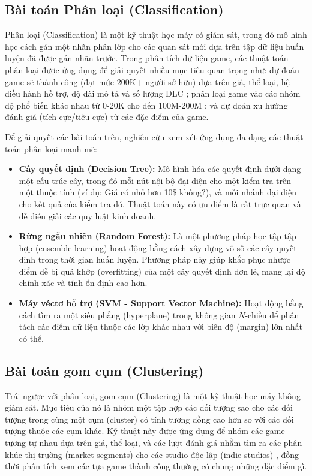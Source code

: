 \subsection{Bài toán Phân loại (Classification)}
\hspace{1cm} Phân loại (Classification) là một kỹ thuật học máy có giám sát, trong đó mô hình học cách gán một nhãn phân lớp cho các quan sát mới dựa trên tập dữ liệu huấn luyện đã được gán nhãn trước. Trong phân tích dữ liệu game, các thuật toán phân loại được ứng dụng để giải quyết nhiều mục tiêu quan trọng như: dự đoán game sẽ thành công (đạt mức 200K+ người sở hữu) dựa trên giá, thể loại, hệ điều hành hỗ trợ, độ dài mô tả và số lượng DLC ; phân loại game vào các nhóm độ phổ biến khác nhau từ 0-20K cho đến 100M-200M ; và dự đoán xu hướng đánh giá (tích cực/tiêu cực) từ các đặc điểm của game.

\hspace{1cm} Để giải quyết các bài toán trên, nghiên cứu xem xét ứng dụng đa dạng các thuật toán phân loại mạnh mẽ:
\begin{itemize}
    \item \textbf{Cây quyết định (Decision Tree):} Mô hình hóa các quyết định dưới dạng một cấu trúc cây, trong đó mỗi nút nội bộ đại diện cho một kiểm tra trên một thuộc tính (ví dụ: Giá có nhỏ hơn 10\$ không?), và mỗi nhánh đại diện cho kết quả của kiểm tra đó. Thuật toán này có ưu điểm là rất trực quan và dễ diễn giải các quy luật kinh doanh.
    \item \textbf{Rừng ngẫu nhiên (Random Forest):} Là một phương pháp học tập tập hợp (ensemble learning) hoạt động bằng cách xây dựng vô số các cây quyết định trong thời gian huấn luyện. Phương pháp này giúp khắc phục nhược điểm dễ bị quá khớp (overfitting) của một cây quyết định đơn lẻ, mang lại độ chính xác và tính ổn định cao hơn.
    \item \textbf{Máy véctơ hỗ trợ (SVM - Support Vector Machine):} Hoạt động bằng cách tìm ra một siêu phẳng (hyperplane) trong không gian $N$-chiều để phân tách các điểm dữ liệu thuộc các lớp khác nhau với biên độ (margin) lớn nhất có thể.
\end{itemize}

\subsection{Bài toán gom cụm (Clustering)}
\hspace{1cm} Trái ngược với phân loại, gom cụm (Clustering) là một kỹ thuật học máy không giám sát. Mục tiêu của nó là nhóm một tập hợp các đối tượng sao cho các đối tượng trong cùng một cụm (cluster) có tính tương đồng cao hơn so với các đối tượng thuộc các cụm khác. Kỹ thuật này được ứng dụng để nhóm các game tương tự nhau dựa trên giá, thể loại, và các lượt đánh giá nhằm tìm ra các phân khúc thị trường (market segments) cho các studio độc lập (indie studios) , đồng thời phân tích xem các tựa game thành công thường có chung những đặc điểm gì.

